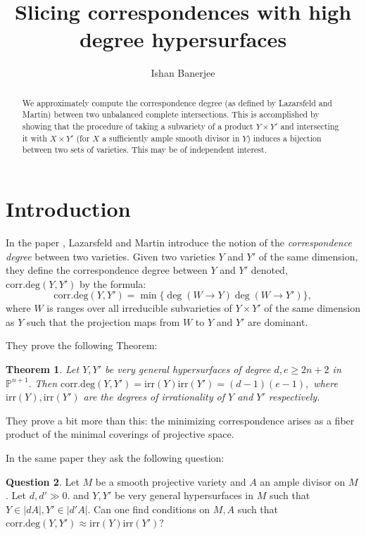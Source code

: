 \documentclass[12pt]{amsart}
\numberwithin{equation}{section}
\newtheorem{theorem}{Theorem}
\numberwithin{theorem}{section}
\theoremstyle{definition}
\theoremstyle{definition}
\newtheorem{question}[theorem]{Question}
\def\PP{{\mathbb{P}}}
\newcommand{\cd}{\textrm{corr.deg}}
\newcommand{\irr}{\textrm{irr}}
\begin{document}
\title{Slicing correspondences with high degree hypersurfaces}
\author{Ishan Banerjee}
\maketitle

\begin{abstract}
    We approximately compute the correspondence degree (as defined by Lazarsfeld and Martin) between two unbalanced complete intersections. This is accomplished by showing that the procedure of taking a subvariety of a product $Y \times Y'$ and intersecting it with $X \times Y'$ (for $X$ a sufficiently ample smooth divisor in $Y$) induces a bijection between two sets of varieties. This may be of independent interest.
\end{abstract}

\section{Introduction}
In the paper \cite{LM}, Lazarsfeld and Martin introduce the notion of the \emph{correspondence degree} between two varieties. Given two varieties $Y$ and $Y'$ of the same dimension, they define the correspondence degree between $Y$ and $Y'$ denoted, $\cd(Y, Y')$ by the formula: $$ \cd(Y, Y') = \min\{ \deg(W \to Y) \deg(W \to Y') \},
$$
where $W$ is ranges over all irreducible subvarieties of $Y \times Y'$ of the same dimension as $Y$ such that the projection maps from $W$ to $Y$ and $Y'$ are dominant.

They prove the following Theorem: 
\begin{theorem}
    Let $Y, Y'$ be very general hypersurfaces of degree $d, e \ge  2n+ 2$ in $\PP^{n+1}.$ Then $\cd (Y, Y') =  \irr (Y)\irr(Y') = (d-1)(e-1),$ where $\irr(Y), \irr(Y')$ are the degrees of irrationality of $Y$ and $Y'$ respectively.
\end{theorem}

They prove a bit more than this: the minimizing correspondence arises as a fiber product of the minimal coverings of projective space. 

In the same paper they ask the following question:
\begin{question}\label{qnLM}
Let $M$ be a smooth projective variety and $A$ an ample divisor on $M$. Let $d, d' \gg 0.$
    and $Y, Y'$ be  very general hypersurfaces in $M$ such that $Y \in |dA|, Y' \in |d' A|.$ Can one find conditions on $M, A$ such that $\cd(Y,Y') \approx \irr(Y) \irr(Y')?$
\end{question}
\end{document}
